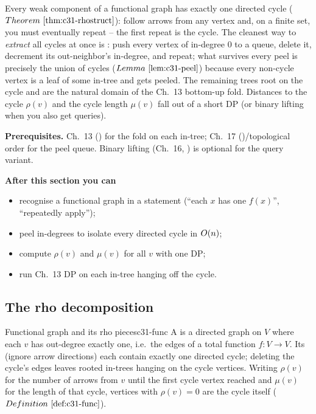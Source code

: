 \begin{topicintro}
Every weak component of a functional graph has exactly one directed cycle
(\(\thmref{c31-rhostruct}\)): follow arrows from any vertex and, on a finite set, you
must eventually repeat -- the first repeat is the cycle.  The cleanest way to
\emph{extract} all cycles at once is : push every vertex of
in-degree \(0\) to a queue, delete it, decrement its out-neighbor's in-degree, and
repeat; what survives every peel is precisely the union of cycles
(\(\lemref{c31-peel}\)) because every non-cycle vertex is a leaf of some in-tree and
gets peeled.  The remaining trees root on the cycle and are the natural domain of
the Ch.~13 bottom-up fold.  Distances to the cycle \(\rho(v)\) and the cycle length
\(\mu(v)\) fall out of a short DP (or binary lifting when you also get queries).

\textbf{Prerequisites.} Ch.~13 () for the fold on each in-tree; Ch.~17
()/topological order for the peel queue.  Binary lifting (Ch.~16,
) is optional for the query variant.

\textbf{After this section you can}
\begin{itemize}[nosep]
  \item recognise a functional graph in a statement (``each \(x\) has one \(f(x)\)'', ``repeatedly apply''); \hfill{}
  \item peel in-degrees to isolate every directed cycle in \(O(n)\); \hfill{}
  \item compute \(\rho(v)\) and \(\mu(v)\) for all \(v\) with one DP; \hfill{}
  \item run Ch.~13 DP on each in-tree hanging off the cycle. \hfill{}
\end{itemize}
\end{topicintro}

\subsection{The rho decomposition}

\begin{definition}{Functional graph and its rho pieces}{c31-func}
A  is a directed graph on \(V\) where each \(v\) has out-degree
exactly one, i.e.\ the edges of a total function \(f\colon V\to V\).  Its
 (ignore arrow directions) each contain exactly one directed
cycle; deleting the cycle's edges leaves rooted in-trees hanging on the cycle
vertices.  Writing \(\rho(v)\) for the number of arrows from \(v\) until the first
cycle vertex reached and \(\mu(v)\) for the length of that cycle, vertices with
\(\rho(v)=0\) are the cycle itself (\(\defref{c31-func}\)).
\end{definition}

